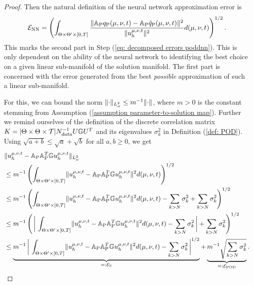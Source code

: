 \begin{proof}
    Then the natural definition of the neural network approximation error is
    \begin{equation}
        \mathcal{E}_{\text{NN}} = \left( \int_{\Theta \times \Theta' \times [0, T]} \frac{\lVert \mathbb{A}_\text{P} 
        q_\text{P}(\mu, \nu, t) - 
        \mathbb{A}_\text{P} \hat{q}_\text{P}(\mu, \nu, t) \rVert^2}{\lVert u_h^{\mu, \nu, t} \rVert^2} d(\mu, \nu, t) \right)^{1/2}.
    \end{equation}
    This marks the second part in Step (\ref{eq: decomposed errors poddnn}). This is only dependent on the ability of 
    the neural network to identifying the best choice on a given linear sub-manifold of the solution manifold. 
    The first part is concerned with the error generated from the best \emph{possible} approximation of such a 
    linear sub-manifold.
    
    For this, we can bound the norm $\lVert  \cdot  \rVert_{L^2_\omega} \leq m^{-1} \lVert  \cdot  \rVert$, 
    where $m > 0$ is the constant stemming from Assumption (\ref{assumption parameter-to-solution map}). 
    Further we remind ourselves of the definition of the discrete correlation matrix 
    $K = \vert \Theta \times \Theta \times \mathcal{T} \vert N_{data}^{-1} U \mathbb{G} U^T$ and its eigenvalues 
    $\sigma_k^2$ in Definition (\ref{def: POD}). Using $\sqrt{a + b} \leq \sqrt{a} + \sqrt{b}$ for all $a,b \geq 0$, we get
    \begin{align*}
        &\norm{\uht - \A_\text{P} \A_\text{P}^T \G \uht}_{L^2_\omega} \\
        &\leq m^{-1} \left( \int_{\Theta \times \Theta' \times [0, T]} \norm{\uht - \A_\text{P} \A_\text{P}^T \G \uht}^2 
        d(\mu, \nu, t) \right)^{1/2} \\
        &\leq m^{-1} \left( \int_{\Theta \times \Theta' \times [0, T]} \norm{\uht - \A_\text{P} \A_\text{P}^T \G \uht}^2 
        d(\mu, \nu, t) - \sum_{k > N} \sigma_k^2  + \sum_{k > N} \sigma_k^2 \right)^{1/2} \\
        &\leq m^{-1} \left( \, \bigg\vert \, \int_{\Theta \times \Theta' \times [0, T]} \norm{\uht - 
        \A_\text{P} \A_\text{P}^T \G \uht}^2 d(\mu, \nu, t) - \sum_{k > N} \sigma_k^2 \, \bigg\vert + \sum_{k > N} \sigma_k^2 \right)^{1/2} \\
        &\leq \underbrace{m^{-1} \, \bigg\vert \, \int_{\Theta \times \Theta' \times [0, T]} \norm{\uht - 
        \A_\text{P} \A_\text{P}^T \G \uht}^2 d(\mu, \nu, t) - \sum_{k > N} \sigma_k^2 \, \bigg\vert^{1/2}}_{
            =: \mathcal{E}_\text{S}} + \underbrace{m^{-1} \sqrt{\sum_{k > N} \sigma_k^2}}_{=: \mathcal{E}_{\text{POD}}}. \\

\end{align*}
\end{proof}

